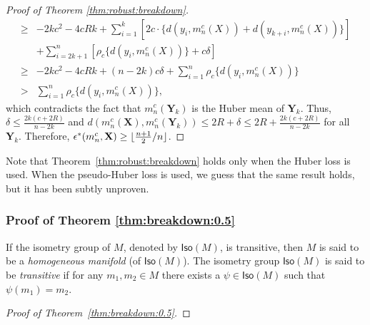 \documentclass[preprint]{imsart}
\DeclarePairedDelimiter\floor{\lfloor}{\rfloor}
\newcommand{\bX}{\mathbf{X}}
\newcommand{\bY}{\mathbf{Y}}
\theoremstyle{plain}
\theoremstyle{remark}
\begin{document}
\begin{appendix}
\begin{proof}[Proof of Theorem \ref{thm:robust:breakdown}]
\begin{align*}
 \ge & -2kc^2 - 4cRk + \sum_{i=1}^{k} [2c \cdot \{d(y_i, m^{c}_{n}(X)) + d(y_{k+i}, m^{c}_{n}(X))\}] \\ & + \sum_{i=2k+1}^{n} [\rho_{c}\{d(y_i, m^{c}_{n}(X))\} +c\delta] \\
 \ge &-2kc^2 -4cRk +(n-2k)c\delta + \sum_{i=1}^{n} \rho_{c}\{d(y_i, m^{c}_{n}(X))\} \\ > & \sum_{i=1}^{n} \rho_{c}\{d(y_i, m^{c}_{n}(X))\},  
\end{align*} 
which contradicts the fact that $m^{c}_{n}(\bY_k)$ is the Huber mean of $\bY_k$. Thus, $\delta \le \frac{2k(c+2R)}{n-2k}$ and $d(m^{c}_{n}(\bX), m^{c}_{n}(\bY_k)) \le 2R + \delta \le 2R + \frac{2k(c+2R)}{n-2k}$ for all $\bY_k$. Therefore, $\epsilon^*(m^{c}_{n},\bX) \ge \floor{\frac{n+1}{2}/n}$.
\end{proof}


Note that Theorem~\ref{thm:robust:breakdown} holds only when the Huber loss is used. When the pseudo-Huber loss is used, we guess that the same result holds, but it has been subtly unproven. 


\subsubsection{Proof of Theorem \ref{thm:breakdown:0.5}}

If the isometry group of $M$, denoted by $\textsf{Iso}(M)$, is transitive, then $M$ is said to be a \emph{homogeneous manifold} (of $\textsf{Iso}(M)$). The isometry group $\textsf{Iso}(M)$ is said to be \textit{transitive} if for any $m_{1}, m_{2} \in M$ there exists a $\psi \in \textsf{Iso}(M)$ such that $\psi(m_{1})=m_{2}$.


 
\begin{proof}[Proof of Theorem~\ref{thm:breakdown:0.5}]



\end{proof}
\end{appendix}
\end{document}
